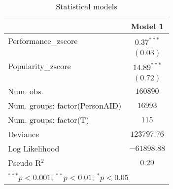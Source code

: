 
\begin{table}
\begin{center}
\begin{tabular}{l c}
\hline
 & Model 1 \\
\hline
Performance\_zscore            & $0.37^{***}$  \\
                               & $(0.03)$      \\
Popularity\_zscore             & $14.89^{***}$ \\
                               & $(0.72)$      \\
\hline
Num. obs.                      & $160890$      \\
Num. groups: factor(PersonAID) & $16993$       \\
Num. groups: factor(T)         & $115$         \\
Deviance                       & $123797.76$   \\
Log Likelihood                 & $-61898.88$   \\
Pseudo R$^2$                   & $0.29$        \\
\hline
\multicolumn{2}{l}{\scriptsize{$^{***}p<0.001$; $^{**}p<0.01$; $^{*}p<0.05$}}
\end{tabular}
\caption{Statistical models}
\label{table:coefficients}
\end{center}
\end{table}
